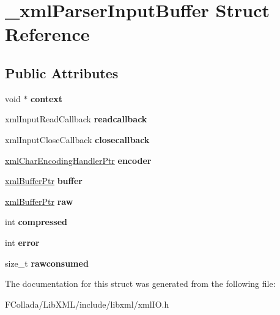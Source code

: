 \hypertarget{struct__xmlParserInputBuffer}{
\section{\_\-xmlParserInputBuffer Struct Reference}
\label{struct__xmlParserInputBuffer}
}
\subsection*{Public Attributes}
\begin{DoxyCompactItemize}
\item 
\hypertarget{struct__xmlParserInputBuffer_a6396a2f2ac55266f0b1bf01d6230d475}{
void $\ast$ {\bfseries context}}
\label{struct__xmlParserInputBuffer_a6396a2f2ac55266f0b1bf01d6230d475}

\item 
\hypertarget{struct__xmlParserInputBuffer_a69f574b183e3acafcfb08e97370ca38a}{
xmlInputReadCallback {\bfseries readcallback}}
\label{struct__xmlParserInputBuffer_a69f574b183e3acafcfb08e97370ca38a}

\item 
\hypertarget{struct__xmlParserInputBuffer_a2da9a3f7231857d19ac2ee41c61dfee2}{
xmlInputCloseCallback {\bfseries closecallback}}
\label{struct__xmlParserInputBuffer_a2da9a3f7231857d19ac2ee41c61dfee2}

\item 
\hypertarget{struct__xmlParserInputBuffer_af72974d4e9a48cdbd29c5071d07f3d69}{
\hyperlink{struct__xmlCharEncodingHandler}{xmlCharEncodingHandlerPtr} {\bfseries encoder}}
\label{struct__xmlParserInputBuffer_af72974d4e9a48cdbd29c5071d07f3d69}

\item 
\hypertarget{struct__xmlParserInputBuffer_acfa649a4c5dcaff889c49c885ea02af7}{
\hyperlink{struct__xmlBuffer}{xmlBufferPtr} {\bfseries buffer}}
\label{struct__xmlParserInputBuffer_acfa649a4c5dcaff889c49c885ea02af7}

\item 
\hypertarget{struct__xmlParserInputBuffer_a5a75f422c4d6a4d5a4c7da12b7564bfe}{
\hyperlink{struct__xmlBuffer}{xmlBufferPtr} {\bfseries raw}}
\label{struct__xmlParserInputBuffer_a5a75f422c4d6a4d5a4c7da12b7564bfe}

\item 
\hypertarget{struct__xmlParserInputBuffer_aa17c64fa46053ce3e42ac219d15418d4}{
int {\bfseries compressed}}
\label{struct__xmlParserInputBuffer_aa17c64fa46053ce3e42ac219d15418d4}

\item 
\hypertarget{struct__xmlParserInputBuffer_a5759b0b008b6fda05e9e850ed7bea149}{
int {\bfseries error}}
\label{struct__xmlParserInputBuffer_a5759b0b008b6fda05e9e850ed7bea149}

\item 
\hypertarget{struct__xmlParserInputBuffer_a0986b9d669ce9cdbbbf1a43489a8f98c}{
size\_\-t {\bfseries rawconsumed}}
\label{struct__xmlParserInputBuffer_a0986b9d669ce9cdbbbf1a43489a8f98c}

\end{DoxyCompactItemize}


The documentation for this struct was generated from the following file:\begin{DoxyCompactItemize}
\item 
FCollada/LibXML/include/libxml/xmlIO.h\end{DoxyCompactItemize}
